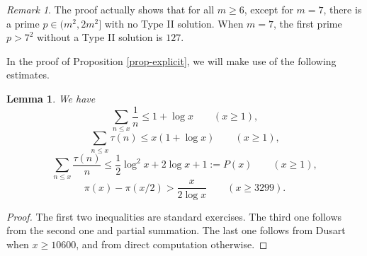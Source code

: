 \documentclass[12pt]{amsart}
\newtheorem{lemma}[theorem]{Lemma}
\theoremstyle{definition}
\theoremstyle{remark}
\newtheorem{remark}[theorem]{Remark}
\numberwithin{equation}{section}
\begin{document}
\begin{remark}
The proof actually shows that for all $m\ge 6$, except for $m=7$, there is a prime $p\in (m^2, 2m^2]$ with no Type II solution.
When $m=7$, the first prime $p>7^2$ without a Type II solution is $127$.
\end{remark}


In the proof of Proposition \ref{prop-explicit}, we will make use of the following estimates.
\begin{lemma}\label{lem2}
We have
$$
\sum_{n\le x} \frac{1}{n} \le  1+\log x \qquad (x\ge  1),
$$
$$
\sum_{n\le x} \tau(n)  \le x (1+\log x) \qquad (x \ge 1),
$$
$$
\sum_{n\le x} \frac{\tau(n)}{n}  \le \frac{1}{2} \log^2 x + 2 \log x + 1 :=P(x) \qquad (x \ge 1),
$$
$$
\pi(x)-\pi(x/2)> \frac{x}{2\log x} \qquad (x \ge 3299).
$$

\end{lemma}
\begin{proof}
The first two inequalities are standard exercises.
The third one follows from the second one and partial summation.
The last one follows from Dusart \cite[Eq. (5.5)]{Dus} when $x\ge 10600$, and from direct computation otherwise.
\end{proof}
\end{document}
